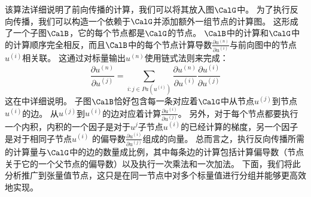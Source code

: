 
该算法详细说明了前向传播的计算，我们可以将其放入图$\CalG$中。
为了执行反向传播，我们可以构造一个依赖于$\CalG$并添加额外一组节点的计算图。
这形成了一个子图$\CalB$，它的每个节点都是$\CalG$的节点。
$\CalB$中的计算和$\CalG$中的计算顺序完全相反，而且$\CalB$中的每个节点计算导数$\frac{\partial u^{(n)}}{\partial u^{(i)}}$与前向图中的节点$u^{(i)}$相关联。
这通过对标量输出$u^{(n)}$使用链式法则来完成：
\begin{equation}
  \frac{\partial u^{(n)}}{\partial u^{(j)}} = \sum_{i:j \in Pa(u^{(i)})} \frac{\partial u^{(n)} }{ \partial u^{(i)} } \frac{ \partial u^{(i)} }{ \partial u^{(j)} }
  \label{eq:6.49}
\end{equation}
这在中详细说明。
子图$\CalB$恰好包含每一条对应着$\CalG$中从节点$u^{(j)}$到节点$u^{(i)}$的边。
从$u^{(j)}$到$u^{(i)}$的边对应着计算$\frac{\partial u^{(i)}}{\partial u^{(j)}}$。
另外，对于每个节点都要执行一个内积，内积的一个因子是对于$u^{j}$子节点$u^{(i)}$的已经计算的梯度，另一个因子是对于相同子节点$u^{(i)}$ 的偏导数$\frac{\partial u^{(i)}}{\partial u^{(j)}}$组成的向量。
总而言之，执行反向传播所需的计算量与$\CalG$中的边的数量成比例，其中每条边的计算包括计算偏导数（节点关于它的一个父节点的偏导数）以及执行一次乘法和一次加法。
下面，我们将此分析推广到张量值节点，这只是在同一节点中对多个标量值进行分组并能够更高效地实现。
